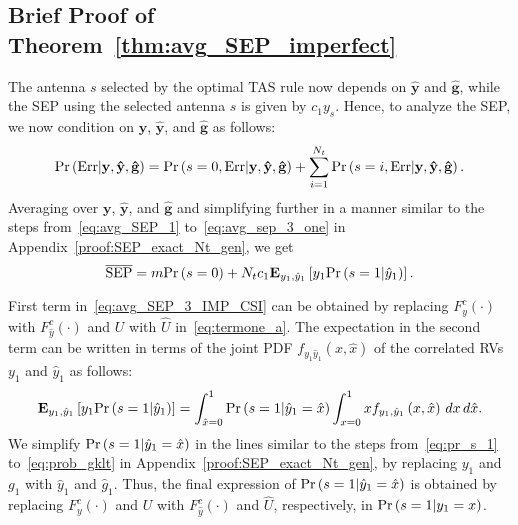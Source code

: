 \documentclass[12pt,draftcls,peerreview,onecolumn]{IEEEtran}
\newcommand{\brac}[1]{\left({#1}\right)}
\newcommand{\explow}[2]{{\bf{E}}_{#1}\left[{#2}\right]}
\newcommand{\prob}[1]{\text{Pr}\brac{#1}}
\newcommand{\given}{\arrowvert}
\newcommand{\SEP}{\text{SEP}}
\newcommand{\y}{\mathbf{y}}
\newcommand{\nx}{{0}}
\newcommand{\Err}{{\text{Err}}}
\newcommand{\Nt}{{N_t}}
\newcommand{\puch}{g}
\newcommand{\gk}[1]{{\puch_{#1}}}
\newcommand{\ghatvec}{\mathbf{\hat{\puch}}}
\newcommand{\yhatvec}{\mathbf{\hat{y}}}
\newcommand{\cone}{c_{1}}
\newcommand{\m}{\cone}
\newcommand{\yk}[1]{y_{#1}}
\newcommand{\un}{U}
\newcommand{\zerosep}{m}
\newcommand{\avgSEP}{\overline{\SEP}}
\newcommand{\unhat}{\widehat{\un}}
\newcommand{\ghat}{\hat{\puch}}
\newcommand{\yhat}{\hat{y}}
\newcommand{\gkhat}[1]{\ghat_{#1}}
\newcommand{\ykhat}[1]{\hat{y}_{#1}}
\newcommand{\ccdfyrv}[1]{ F^{c}_{y}\left(#1 \right) }
\newcommand{\ccdfyhatrv}[1]{F^{c}_{\yhat}\left(#1 \right) }
\newcommand{\xhat}{\hat{x}}
\begin{document}
\subsection{Brief Proof of Theorem~\ref{thm:avg_SEP_imperfect}}
\label{proof:avg_SEP_imperfect_CSI}
The antenna $s$ selected by the optimal TAS rule now depends on $\yhatvec$ and $\ghatvec$, while the SEP using the selected antenna $s$ is given by $\cone\yk{s}$.  Hence, to analyze the SEP, we now condition on $\y$, $\yhatvec$, and $\ghatvec$ as follows:
%
\begin{equation}
\prob{\Err \given \y,\yhatvec,\ghatvec} =  \prob{s=\nx,\Err\given \y, \yhatvec,\ghatvec} + \sum_{i=1}^{\Nt}\prob{s=i,\Err\given\y,\yhatvec,\ghatvec}.
\label{eq:Perr_all_imp_csi}
\end{equation}  
%
Averaging over $\y$, $\yhatvec$, and $\ghatvec$ and simplifying further in a manner similar to the steps from~\eqref{eq:avg_SEP_1} to~\eqref{eq:avg_sep_3_one} in Appendix~\ref{proof:SEP_exact_Nt_gen}, we get
%
\begin{equation}
\label{eq:avg_SEP_3_IMP_CSI}
\avgSEP = \zerosep \prob{s=\nx} + \Nt\m\explow{\yk{1},\ykhat{1}}{\yk{1}\prob{s=1\given \ykhat{1}}}.
\end{equation}
%

First term in~\eqref{eq:avg_SEP_3_IMP_CSI} can be obtained by replacing  $\ccdfyrv{\cdot}$ with $\ccdfyhatrv{\cdot}$ and $\un$ with $\unhat$ in~\eqref{eq:termone_a}. The expectation in the second term can be written in terms of the joint PDF $f_{\yk{1}\ykhat{1}}\left(x,\xhat\right)$ of the correlated RVs $\yk{1}$ and $\ykhat{1}$ as follows:
%
\begin{equation}
\label{eq:avg_SEP_4_IMP_CSI}
\explow{\yk{1},\ykhat{1}}{\yk{1}\prob{s=1\given \ykhat{1}}}= \int_{\xhat=0}^{1} \prob{s=1\given \ykhat{1}=\xhat} \int_{x=0}^{1} x  f_{\yk{1},\ykhat{1}}\left(x,\xhat\right)\,dx\,d\xhat.
\end{equation}
%
We simplify $\prob{s=1\given\ykhat{1}=\xhat}$ in the lines similar to the steps from~\eqref{eq:pr_s_1} to~\eqref{eq:prob_gklt} in Appendix~\ref{proof:SEP_exact_Nt_gen},  by replacing $\yk{1}$ and $\gk{1}$ with $\ykhat{1}$ and $\gkhat{1}$. Thus, the final expression of $\prob{s=1\given\ykhat{1}=\xhat}$ is obtained by replacing $\ccdfyrv{\cdot}$ and $\un$ with $\ccdfyhatrv{\cdot}$ and $\unhat$, respectively, in $\prob{s=1\given\yk{1}=x}$. 
\end{document}
